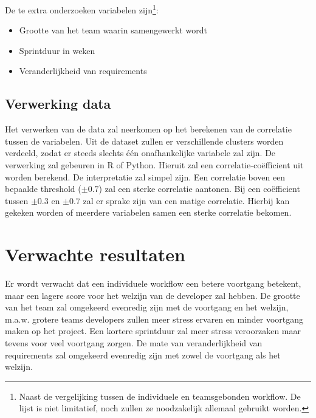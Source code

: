 De te extra onderzoeken variabelen zijn\footnote{Naast de vergelijking tussen de individuele en teamsgebonden workflow. De lijst is niet limitatief, noch zullen ze noodzakelijk allemaal gebruikt worden.}:
\begin{itemize}
\item Grootte van het team waarin samengewerkt wordt
\item Sprintduur in weken
\item Veranderlijkheid van requirements
\end{itemize}

\subsection{Verwerking data}
Het verwerken van de data zal neerkomen op het berekenen van de correlatie tussen de variabelen. Uit de dataset zullen er verschillende clusters worden verdeeld, zodat er steeds slechts één onafhankelijke variabele zal zijn. 
De verwerking zal gebeuren in R of Python. Hieruit zal een correlatie-coëfficient uit worden berekend. De interpretatie zal simpel zijn. Een correlatie boven een bepaalde threshold ($\pm 0.7$) zal een sterke correlatie aantonen. Bij een coëfficient tussen $\pm 0.3$ en $\pm 0.7$ zal er sprake zijn van een matige correlatie. Hierbij kan gekeken worden of meerdere variabelen samen een sterke correlatie bekomen.

\section{Verwachte resultaten}
\label{sec:verwachte_resultaten}


Er wordt verwacht dat een individuele workflow een betere voortgang betekent, maar een lagere score voor het welzijn van de developer zal hebben. De grootte van het team zal omgekeerd evenredig zijn met de voortgang en het welzijn, m.a.w. grotere teams developers zullen meer stress ervaren en minder voortgang maken op het project. Een kortere sprintduur zal meer stress veroorzaken maar tevens voor veel voortgang zorgen. De mate van veranderlijkheid van requirements zal omgekeerd evenredig zijn met zowel de voortgang als het welzijn. 

